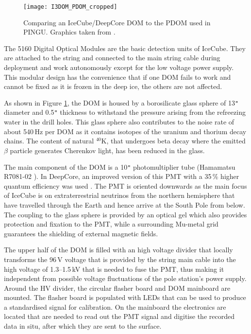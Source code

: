 \begin{figure}[htp]
 \centering
 \texttt{[image: I3DOM\_PDOM\_cropped]}
 \caption{Comparing an IceCube/DeepCore DOM to the PDOM used in PINGU. Graphics 
taken from \cite{PDOM_Aachen}.}
 \label{fig:DOM}
\end{figure}

The 5160 Digital Optical Modules are the basic detection units of IceCube. They 
are attached to the string and connected to the main string cable during 
deployment and work autonomously except for the low voltage power supply. This 
modular design has the convenience that if one DOM fails to work and cannot be 
fixed as it is frozen in the deep ice, the others are not affected.

As shown in Figure \ref{fig:DOM}, the DOM is housed by a borosilicate glass 
sphere of 13\verb+"+ diameter and 0.5\verb+"+ thickness to withstand the 
pressure arising from the refreezing water in the drill holes. This glass sphere 
also contributes to the noise rate of about 540\,Hz per DOM as it contains 
isotopes of the uranium and thorium decay chains. The content of natural 
$^{40}\mathrm{K}$, that undergoes beta decay where the emitted $\beta$ particle
generates Cherenkov light, has been reduced in the glass.

The main component of the DOM is a 10\verb+"+ photomultiplier tube (Hamamatsu 
R7081-02 \cite{PMTpaper,PMTdata}). In DeepCore, an improved version of this PMT 
with a 35\,\% higher quantum efficiency was used \cite{DCDesign}. The PMT is 
oriented downwards as the main focus of IceCube is on extraterrestrial neutrinos 
from the northern hemisphere that have travelled through the Earth and hence 
arrive at the South Pole from below. The coupling to the glass sphere is 
provided by an optical gel which also provides protection and fixation to the 
PMT, while a surrounding Mu-metal grid guarantees the shielding of external 
magnetic fields.

The upper half of the DOM is filled with an high voltage divider that locally 
transforms the 96\,V voltage that is provided by the string main cable into the 
high voltage of 1.3--1.5\,kV that is needed to fuse the PMT, thus making it 
independent from possible voltage fluctuations of the pole station's power 
supply. Around the HV divider, the circular flasher board and DOM mainboard are 
mounted. The flasher board is populated with LEDs that can be used to produce a 
standardised signal for calibration. On the mainboard the electronics are 
located that are needed to read out the PMT signal and digitise the recorded 
data in situ, after which they are sent to the surface.

